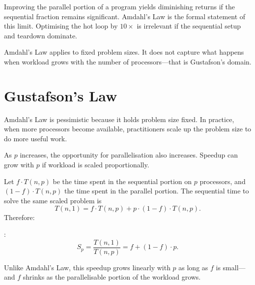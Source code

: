 \begin{pppitfall}
Improving the parallel portion of a program yields diminishing returns if the
sequential fraction remains significant. Amdahl's Law is the formal statement
of this limit. Optimising the hot loop by $10\times$ is irrelevant if the
sequential setup and teardown dominate.
\end{pppitfall}

Amdahl's Law applies to fixed problem sizes. It does not capture what happens
when workload grows with the number of processors---that is Gustafson's domain.

\section{Gustafson's Law}

Amdahl's Law is pessimistic because it holds problem size fixed. In practice,
when more processors become available, practitioners scale up the problem size
to do more useful work.

\begin{ppkey}
As $p$ increases, the opportunity for parallelisation also increases. Speedup
can grow with $p$ if workload is scaled proportionally.
\end{ppkey}

Let $f \cdot T(n, p)$ be the time spent in the sequential portion on $p$
processors, and $(1 - f) \cdot T(n, p)$ the time spent in the parallel
portion. The sequential time to solve the same scaled problem is
\[
  T(n, 1) = f \cdot T(n, p) + p \cdot (1 - f) \cdot T(n, p).
\]
Therefore:
\begin{ppdefn}
:
\[
  S_p = \frac{T(n, 1)}{T(n, p)} = f + (1 - f) \cdot p.
\]
\end{ppdefn}

Unlike Amdahl's Law, this speedup grows linearly with $p$ as long as $f$ is
small---and $f$ shrinks as the parallelisable portion of the workload grows.

